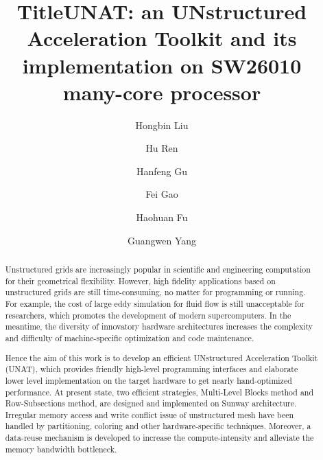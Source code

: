 \documentclass[5p,times]{elsarticle}
\begin{document}
\begin{frontmatter}


\title{Title}
\author[label1]{Hongbin Liu}
\author[label1]{Hu Ren}

\title{UNAT: an UNstructured Acceleration Toolkit and its implementation on SW26010 many-core processor}

\author[label1,label2]{Hanfeng Gu}
\author[label1]{Fei Gao}
\author[label1,label2]{Haohuan Fu}
\author[label1,label2]{Guangwen Yang}
\address[label1]{National Supercomputing Center in Wuxi}
\address[label2]{Tsinghua University}



\begin{abstract}

Unstructured grids are increasingly popular in scientific and engineering computation for their geometrical flexibility. However, high fidelity applications based on unstructured grids are still time-consuming, no matter for programming or running. For example, the cost of large eddy simulation for fluid flow is still unacceptable for researchers, which promotes the development of modern supercomputers. In the meantime, the diversity of innovatory hardware architectures increases the complexity and difficulty of machine-specific optimization and code maintenance.

Hence the aim of this work is to develop an efficient UNstructured Acceleration Toolkit (UNAT), which provides friendly high-level programming interfaces and elaborate lower level implementation on the target hardware to get nearly hand-optimized performance. At present state, two efficient strategies, Multi-Level Blocks method and Row-Subsections method, are designed and implemented on Sunway architecture. Irregular memory access and write conflict issue of unstructured mesh have been handled by partitioning, coloring and other hardware-specific techniques. Moreover, a data-reuse mechanism is developed to increase the compute-intensity and alleviate the memory bandwidth bottleneck.


\end{abstract}
\end{frontmatter}
\end{document}
